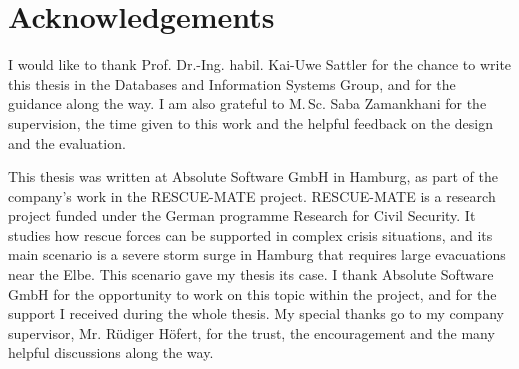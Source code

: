 \chapter*{Acknowledgements}

I would like to thank Prof. Dr.-Ing. habil. Kai-Uwe Sattler for the chance to
write this thesis in the Databases and Information Systems Group, and for the
guidance along the way. I am also grateful to M.\,Sc. Saba Zamankhani for the
supervision, the time given to this work and the helpful feedback on the design
and the evaluation.

This thesis was written at Absolute Software GmbH in Hamburg, as part of the
company's work in the RESCUE-MATE project. RESCUE-MATE is a research project
funded under the German programme Research for Civil Security. It studies how
rescue forces can be supported in complex crisis situations, and its main
scenario is a severe storm surge in Hamburg that requires large evacuations
near the Elbe. This scenario gave my thesis its case. I thank Absolute
Software GmbH for the opportunity to work on this topic within the project,
and for the support I received during the whole thesis. My special thanks go
to my company supervisor, Mr. Rüdiger Höfert, for the trust, the
encouragement and the many helpful discussions along the way.
